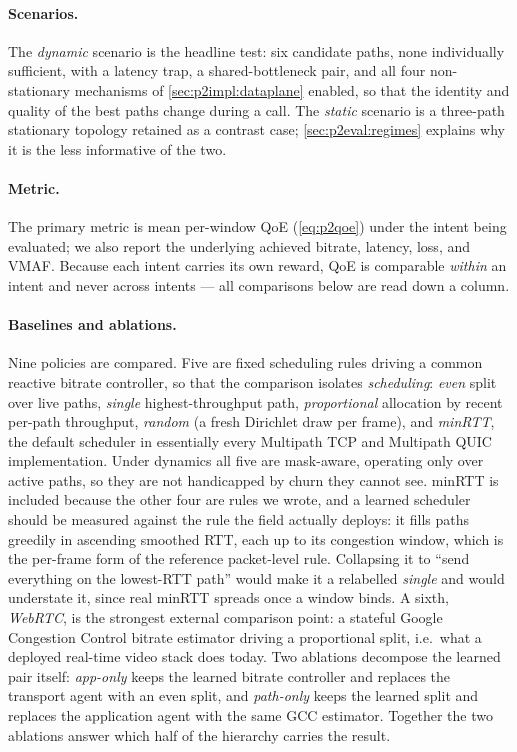 \paragraph{Scenarios.} The \emph{dynamic} scenario is the headline test: six candidate paths, none
individually sufficient, with a latency trap, a shared-bottleneck pair, and all four non-stationary
mechanisms of \cref{sec:p2impl:dataplane} enabled, so that the identity and quality of the best paths
change during a call. The \emph{static} scenario is a three-path stationary topology retained as a
contrast case; \cref{sec:p2eval:regimes} explains why it is the less informative of the two.

\paragraph{Metric.} The primary metric is mean per-window QoE (\cref{eq:p2qoe}) under the intent being
evaluated; we also report the underlying achieved bitrate, latency, loss, and VMAF. Because each intent
carries its own reward, QoE is comparable \emph{within} an intent and never across intents --- all
comparisons below are read down a column.

\paragraph{Baselines and ablations.} Nine policies are compared. Five are fixed scheduling rules
driving a common reactive bitrate controller, so that the comparison isolates \emph{scheduling}:
\emph{even} split over live paths, \emph{single} highest-throughput path, \emph{proportional} allocation
by recent per-path throughput, \emph{random} (a fresh Dirichlet draw per frame), and \emph{minRTT}, the
default scheduler in essentially every Multipath TCP and Multipath QUIC implementation. Under dynamics
all five are mask-aware, operating only over active paths, so they are not handicapped by churn they
cannot see. minRTT is included because the other four are rules we wrote, and a learned scheduler should
be measured against the rule the field actually deploys: it fills paths greedily in ascending smoothed
RTT, each up to its congestion window, which is the per-frame form of the reference packet-level rule.
Collapsing it to ``send everything on the lowest-RTT path'' would make it a relabelled \emph{single} and
would understate it, since real minRTT spreads once a window binds. A sixth, \emph{WebRTC}, is the
strongest external comparison point: a stateful Google Congestion Control bitrate estimator driving a
proportional split, i.e.\ what a deployed real-time video stack does today. Two ablations decompose the learned pair itself: \emph{app-only} keeps the learned bitrate
controller and replaces the transport agent with an even split, and \emph{path-only} keeps the learned
split and replaces the application agent with the same GCC estimator. Together the two ablations answer
which half of the hierarchy carries the result.

